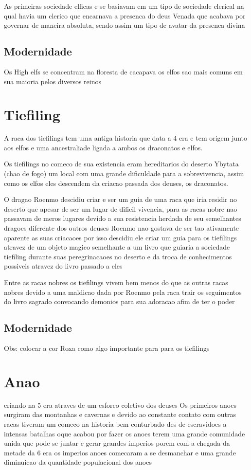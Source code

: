 \documentclass{book}
\begin{document}
As primeiras sociedade elficas e se basiavam em um tipo de sociedade clerical na qual havia um 
clerico que encarnava a presenca do deus Venada que acabava por governar de maneira absoluta,
sendo assim um tipo de avatar da presenca divina 

\subsection*{Modernidade}
Os High elfs se concentram na floresta de cacapava os elfos sao mais comuns em sua maioria 
pelos diversos reinos 

\section{Tiefiling}
A raca dos tiefilings tem uma antiga historia que data a 4 era e tem origem junto aos elfos e 
uma ancestraliade ligada a ambos os draconatos e elfos.

Os tiefilings no comeco de sua existencia eram hereditarios do deserto Ybytata (chao de fogo) 
um local com uma grande dificuldade para a sobrevivencia, assim como os elfos eles descendem 
da criacao passada dos deuses, os draconatos.

O dragao Roenmo descidiu criar e ser um guia de uma raca que iria residir no deserto que apesar 
de ser um lugar de dificil vivencia, para as racas nobre nao passavam de meros lugares devido 
a sua resistencia herdada de seu semelhantes dragoes diferente dos outros deuses Roenmo nao 
gostava de ser tao ativamente aparente as suas criacaoes por isso descidiu ele criar um guia 
para os tiefilings atravez de um objeto magico semelhante a um livro que guiaria a sociedade 
tiefiling durante suas peregrinacaoes no deserto e da troca de conhecimentos possiveis atravez
do livro passado a eles

Entre as racas nobres os tiefilings vivem bem menos do que as outras racas nobres devido a uma 
maldicao dada por Roenmo pela raca trair os seguimentos do livro sagrado convocando demonios 
para sua adoracao afim de ter o poder 

\subsection*{Modernidade}

Obs: colocar a cor Roxa como algo importante para para os tiefilings 

\section{Anao}
criando na 5 era atraves de um esforco coletivo dos deuses 
Os primeiros anoes surgiram das montanhas e cavernas e devido ao constante contato com outras 
racas tiveram um comeco na historia bem conturbado des de escravidoes a intensas batalhas 
oque acabou por fazer os anoes terem uma grande comunidade unida que pode se juntar e gerar 
grandes imperios porem com a chegada da metade da 6 era os imperios anoes comecaram a se 
desmanchar e uma grande diminuicao da quantidade populacional dos anoes 
\end{document}
